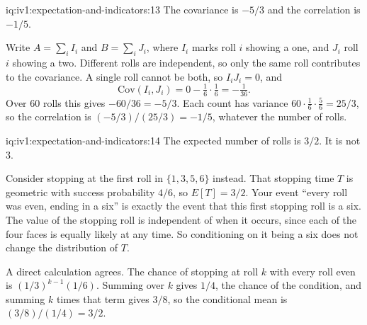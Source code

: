 \enlargethispage{-3\baselineskip}%
\begin{solution}{iq:iv1:expectation-and-indicators:13}
The covariance is $-5/3$ and the correlation is $-1/5$.

Write $A = \sum_i I_i$ and $B = \sum_i J_i$, where $I_i$ marks roll $i$ showing a one, and $J_i$ roll $i$ showing a two. Different rolls are
independent, so only the same roll contributes to the covariance. A single roll cannot be both, so $I_iJ_i = 0$, and
\[
\mathrm{Cov}(I_i, J_i) = 0 - \tfrac16 \cdot \tfrac16 = -\tfrac{1}{36}.
\]
Over 60 rolls this gives $-60/36 = -5/3$. Each count has variance $60 \cdot \tfrac16 \cdot \tfrac56 = 25/3$, so the correlation is
$(-5/3)/(25/3) = -1/5$, whatever the number of rolls.

\end{solution}

\begin{solution}{iq:iv1:expectation-and-indicators:14}
The expected number of rolls is $3/2$. It is not 3.

Consider stopping at the first roll in $\{1, 3, 5, 6\}$ instead. That stopping time $T$ is geometric with success probability $4/6$, so $E[T] = 3/2$.
Your event ``every roll was even, ending in a six'' is exactly the event that this first stopping roll is a six. The value of the stopping roll is
independent of when it occurs, since each of the four faces is equally likely at any time. So conditioning on it being a six does not change the
distribution of $T$.

A direct calculation agrees. The chance of stopping at roll $k$ with every roll even is $(1/3)^{k-1}(1/6)$. Summing over $k$ gives $1/4$, the chance of the condition, and summing $k$
times that term gives $3/8$, so the conditional mean is $(3/8)/(1/4) = 3/2$.

\end{solution}


